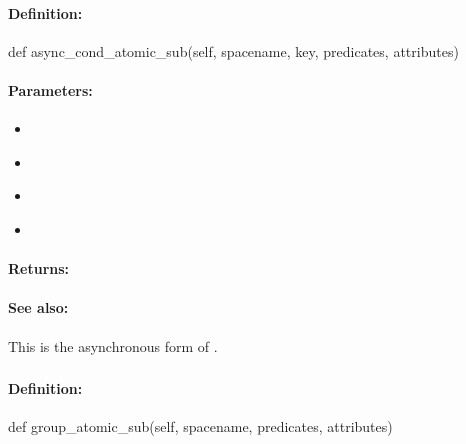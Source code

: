 \paragraph{Definition:}
\begin{pythoncode}
def async_cond_atomic_sub(self, spacename, key, predicates, attributes)
\end{pythoncode}

\paragraph{Parameters:}
\begin{itemize}[noitemsep]
\item {}\\

\item {}\\

\item {}\\

\item {}\\

\end{itemize}

\paragraph{Returns:}


\paragraph{See also:}  This is the asynchronous form of .

\pagebreak
\subsubsection{}
\label{api:python:group_atomic_sub}


\paragraph{Definition:}
\begin{pythoncode}
def group_atomic_sub(self, spacename, predicates, attributes)
\end{pythoncode}

